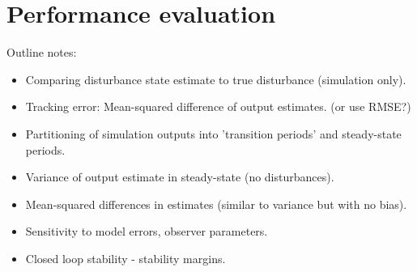 \section{Performance evaluation}

Outline notes:
\begin{itemize}
	\item Comparing disturbance state estimate to true disturbance (simulation only).
	\item Tracking error: Mean-squared difference of output estimates. (or use RMSE?)
	\item Partitioning of simulation outputs into 'transition periods' and steady-state periods.
	\item Variance of output estimate in steady-state (no disturbances).
	\item Mean-squared differences in estimates (similar to variance but with no bias).
	\item Sensitivity to model errors, observer parameters.
	\item Closed loop stability - stability margins.
\end{itemize}

